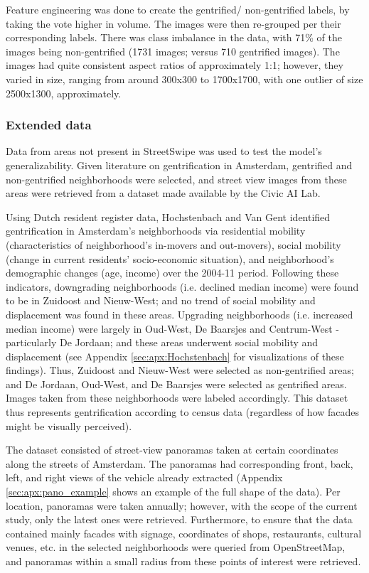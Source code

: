 Feature engineering was done to create the gentrified/ non-gentrified labels, by taking the vote higher in volume. The images were then re-grouped per their corresponding labels. There was class imbalance in the data, with 71\% of the images being non-gentrified (1731 images; versus 710 gentrified images). The images had quite consistent aspect ratios of approximately 1:1; however, they varied in size, ranging from around 300x300 to 1700x1700, with one outlier of size 2500x1300, approximately.


\subsubsection{Extended data}

Data from areas not present in StreetSwipe was used to test the model's generalizability. Given literature on gentrification in Amsterdam, gentrified and non-gentrified neighborhoods were selected, and street view images from these areas were retrieved from a dataset made available by the Civic AI Lab.

Using Dutch resident register data, Hochstenbach and Van Gent \cite{hochstenbach_anatomy_2015} identified gentrification in Amsterdam's neighborhoods via residential mobility (characteristics of neighborhood's in-movers and out-movers), social mobility (change in current residents' socio-economic situation), and neighborhood's demographic changes (age, income) over the 2004-11 period. Following these indicators, downgrading neighborhoods (i.e. declined median income) were found to be in Zuidoost and Nieuw-West; and no trend of social mobility and displacement was found in these areas. Upgrading neighborhoods (i.e. increased median income) were largely in Oud-West, De Baarsjes and Centrum-West - particularly De Jordaan; and these areas underwent social mobility and displacement (see Appendix \ref{sec:apx:Hochstenbach} for visualizations of these findings). Thus, Zuidoost and Nieuw-West were selected as non-gentrified areas; and De Jordaan, Oud-West, and De Baarsjes were selected as gentrified areas. Images taken from these neighborhoods were labeled accordingly. This dataset thus represents gentrification according to census data (regardless of how facades might be visually perceived).

The dataset consisted of street-view panoramas taken at certain coordinates along the streets of Amsterdam. The panoramas had corresponding front, back, left, and right views of the vehicle already extracted (Appendix \ref{sec:apx:pano_example} shows an example of the full shape of the data). Per location, panoramas were taken annually; however, with the scope of the current study, only the latest ones were retrieved. Furthermore, to ensure that the data contained mainly facades with signage, coordinates of shops, restaurants, cultural venues, etc. in the selected neighborhoods were queried from OpenStreetMap, and panoramas within a small radius from these points of interest were retrieved.

